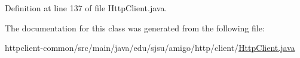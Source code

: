 Definition at line 137 of file Http\+Client.\+java.



The documentation for this class was generated from the following file\+:\begin{DoxyCompactItemize}
\item 
httpclient-\/common/src/main/java/edu/sjsu/amigo/http/client/\hyperlink{_http_client_8java}{Http\+Client.\+java}\end{DoxyCompactItemize}
